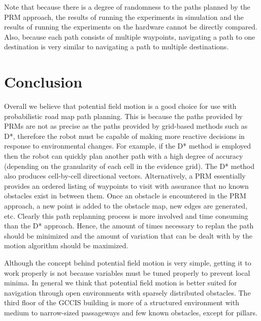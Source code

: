 \documentclass[12pt]{article}
\begin{document}
Note that because there is a degree of randomness to the paths planned by the PRM approach, the results of running the experiments in simulation and the results of running the experiments on the hardware cannot be directly compared. Also, because each path consists of multiple waypoints, navigating a path to one destination is very similar to navigating a path to multiple destinations.


\section{Conclusion}

Overall we believe that potential field motion is a good choice for use with probabilistic road map path planning. This is because the paths provided by PRMs are not as precise as the paths provided by grid-based methods such as D*, therefore the robot must be capable of making more reactive decisions in response to environmental changes. For example, if the D* method is employed then the robot can quickly plan another path with a high degree of accuracy (depending on the granularity of each cell in the evidence grid). The D* method also produces cell-by-cell directional vectors. Alternatively, a PRM essentially provides an ordered listing of waypoints to visit with assurance that no known obstacles exist in between them. Once an obstacle is encountered in the PRM approach, a new point is added to the obstacle map, new edges are generated, etc. Clearly this path replanning process is more involved and time consuming than the D* approach. Hence, the amount of times necessary to replan the path should be minimized and the amount of variation that can be dealt with by the motion algorithm should be maximized.

Although the concept behind potential field motion is very simple, getting it to work properly is not because variables must be tuned properly to prevent local minima. In general we think that potential field motion is better suited for navigation through open environments with sparsely distributed obstacles. The third floor of the GCCIS building is more of a structured environment with medium to narrow-sized passageways and few known obstacles, except for pillars. 
\end{document}
